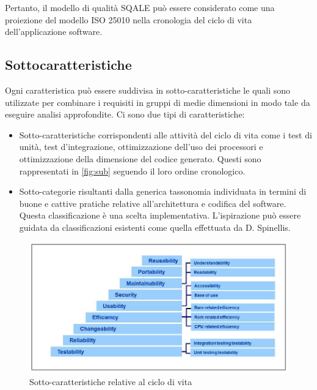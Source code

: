 Pertanto, il modello di qualità SQALE può essere considerato come una proiezione del modello ISO 25010
nella cronologia del ciclo di vita dell’applicazione software.
\subsection{Sottocaratteristiche}
Ogni caratteristica può essere suddivisa in sotto-caratteristiche le quali sono utilizzate per
combinare i requisiti in gruppi di medie dimensioni in modo tale da eseguire analisi approfondite. Ci sono
due tipi di caratteristiche:
\begin{itemize}
	\item  Sotto-caratteristiche corrispondenti alle attività del ciclo di vita come i test di unità, test
	d’integrazione, ottimizzazione dell’uso dei processori e ottimizzazione della dimensione del codice
	generato. Questi sono rappresentati in \autoref{fig:sub} seguendo il loro ordine cronologico.
	\item Sotto-categorie risultanti dalla generica tassonomia individuata in termini di buone e cattive pratiche
	relative all’architettura e codifica del software. Questa classificazione è una scelta implementativa.
	L’ispirazione può essere guidata da classificazioni esistenti come quella effettuata da D. Spinellis.
\end{itemize}
\begin{figure}[htbp]
	\centering
	\includegraphics[scale=0.7, trim = 0cm 0cm 0cm 0cm, clip=true]{figSonarCloud/sub1.PNG}
	\caption{Sotto-caratteristiche relative al ciclo di vita}
	\label{fig:sub}
\end{figure}
